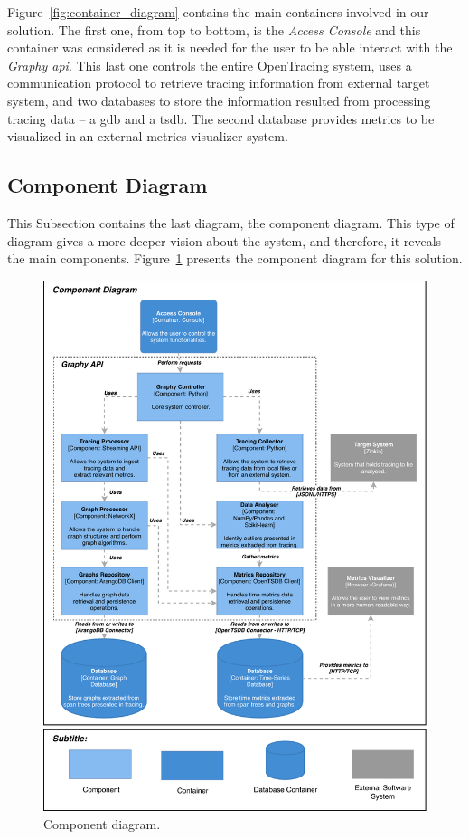 \newpage

Figure~\ref{fig:container_diagram} contains the main containers involved in our solution. The first one, from top to bottom, is the \emph{Access Console} and this container was considered as it is needed for the user to be able interact with the \emph{Graphy \gls{api}}. This last one controls the entire OpenTracing system, uses a communication protocol to retrieve tracing information from external target system, and two databases to store the information resulted from processing tracing data -- a \gls{gdb} and a \gls{tsdb}. The second database provides metrics to be visualized in an external metrics visualizer system.

\subsection{Component Diagram}
\label{subsec:component_diagram}

This Subsection contains the last diagram, the component diagram. This type of diagram gives a more deeper vision about the system, and therefore, it reveals the main components. Figure~\ref{fig:component_diagram} presents the component diagram for this solution.

\begin{figure}[]
    \centering
    \includegraphics[width=1.00\textwidth]{images/component_diagram.pdf}
    \caption{Component diagram.}
    \label{fig:component_diagram}
\end{figure}

